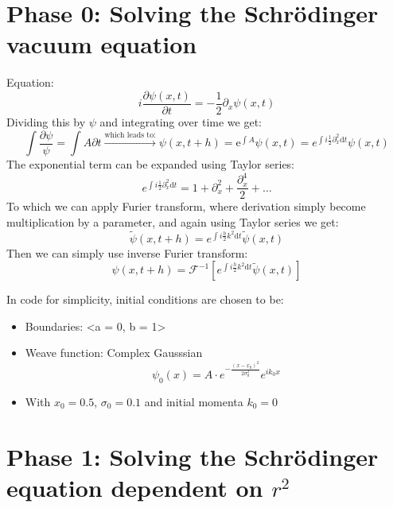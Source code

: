 \section*{Phase 0: Solving the Schrödinger vacuum equation}

Equation:
\begin{equation}
    i \frac{\partial \psi(x,t)}{\partial t} = - \frac{1}{2} \partial_x \psi(x,t)
\end{equation}
Dividing this by $\psi$ and integrating over time we get: 
\begin{equation}
    \int \frac{\partial \psi}{\psi} = \int A \partial t \xrightarrow{\text{which leads to:}} \psi(x,t+h) = \text{e}^{\int A} \psi (x,t) = e^{\int i \frac{1}{2} \partial^2_x \text{d}t}\psi(x,t)
\end{equation}
The exponential term can be expanded using Taylor series:
\begin{equation}
    e^{\int i \frac{1}{2} \partial^2_x \text{d}t} = 1 + \partial^2_x + \frac{\partial^4_x}{2} + \dots
\end{equation}
To which we can apply Furier transform, where derivation simply become multiplication by a parameter, and again using Taylor series we get:
\begin{equation}
    \widetilde{\psi}(x,t+h) = e^{\int i \frac{h}{2} k^2 \text{d}t}\widetilde{\psi}(x,t)
\end{equation}
Then we can simply use inverse Furier transform:
\begin{equation}
    \psi(x,t+h) = \mathscr{F}^{-1} \left[ e^{\int i \frac{h}{2} k^2 \text{d}t}\widetilde{\psi}(x,t) \right] 
\end{equation}

In code for simplicity, initial conditions are chosen to be: 
\begin{itemize}
    \item Boundaries: <a = 0, b = 1>
    \item Weave function: Complex Gausssian \begin{equation}
        \psi_0 (x) = A \cdot e^{-\frac{(x-x_0)^2}{2\sigma^2_0}} e^{ik_0 x}
    \end{equation}
    \item With $x_0 = 0.5$, $\sigma_0 = 0.1$ and initial momenta $k_0 = 0$
\end{itemize}

\section*{Phase 1: Solving the Schrödinger equation dependent on $r^2$}


